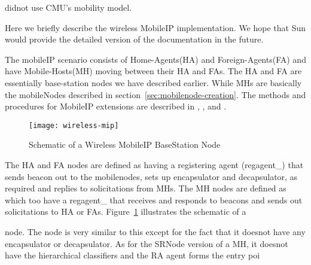 { didnot use CMU's mobility model.

Here we briefly describe the wireless MobileIP implementation. We hope that Sun would provide the detailed version of the documentation in the future.

The mobileIP scenario consists of Home-Agents(HA) and Foreign-Agents(FA) and have Mobile-Hosts(MH) moving between their HA and FAs.
The HA and FA are essentially base-station nodes we have described earlier. While MHs are basically the mobileNodes described in section~\ref{sec:mobilenode-creation}.
The methods and procedures for MobileIP extensions are described in , ,  and .

\begin{figure}
    \centerline{\texttt{[image: wireless-mip]}}
    \caption{Schematic of a Wireless MobileIP BaseStation Node}
    \label{fig:mobilenode-wireless-mip}
\end{figure}
The HA and FA nodes are defined as  having a registering agent (regagent\_) that sends beacon out to the mobilenodes, sets up encapsulator and decapsulator, as required and replies to solicitations from MHs. 
The MH nodes are defined as  which too have a regagent\_ that receives and responds to beacons and sends out solicitations to HA or FAs. Figure~\ref{fig:mobilenode-wireless-mip} illustrates the schematic of a 





















 node. The  node is very similar to this except for the fact that it doesnot have any encapsulator or decapsulator. As for the SRNode version of a MH, it doesnot have the hierarchical classifiers and the RA agent forms the entry poi





















}
